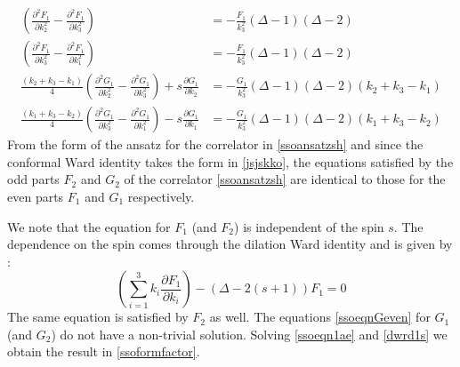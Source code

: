 \documentclass[a4paper,11pt]{article}
\begin{document}
\begin{align}\label{ssoeqn1ae}
\left(\frac{\partial^2 {F}_1}{\partial k_2^2}-\frac{\partial^2 {F}_1}{\partial k_3^2}\right)&= -\frac{{F}_1}{k_3^{2}}(\Delta-1)(\Delta-2)\nonumber\\
\left(\frac{\partial^2{F}_1}{\partial k_3^2}-\frac{\partial^2 {F}_1}{\partial k_1^2}\right)&= -\frac{{F}_1}{k_3^{2}}(\Delta-1)(\Delta-2)\\[5 pt]
\frac{(k_2+k_3-k_1)}{4}\left(\frac{\partial^2 {G}_1}{\partial k_2^2}-\frac{\partial^2 {G}_1}{\partial k_3^2}\right)+s\frac{\partial {G}_1}{\partial k_2} &=-\frac{{G}_1}{k_3^{2}}(\Delta-1)(\Delta-2)(k_2+k_3-k_1) \nonumber\\[5 pt]
\frac{(k_1+k_3-k_2)}{4}\left(\frac{\partial^2 {G}_1}{\partial k_3^2}-\frac{\partial^2 {G}_1}{\partial k_1^2}\right)-s\frac{\partial {G}_1}{\partial k_1} &= -\frac{{G}_1}{k_3^{2}}(\Delta-1)(\Delta-2)(k_1+k_3-k_2)\label{ssoeqnGeven}
\end{align}
From the form of the ansatz for the correlator in \eqref{ssoansatzsh} and since the conformal Ward identity takes the form in \eqref{jsjskko}, the equations satisfied by the odd parts $F_2$ and $G_2$ of the correlator \eqref{ssoansatzsh} are identical to those for the even parts $F_1$ and $G_1$ respectively.

We note that the equation for $F_1$ (and $F_2$) is independent of the spin $s$.
The dependence on the spin comes through the dilation Ward identity and is given by :
\begin{equation}\label{dwrd1s}
\left(\sum_{i=1}^3 k_i \frac{\partial {F}_{1}}{\partial k_i}\right)-(\Delta-2(s+1)){F}_{1}=0
\end{equation}
The same equation is satisfied by $F_2$ as well.
The equations \eqref{ssoeqnGeven} for $G_1$ (and $G_2$) do not have a non-trivial solution. Solving \eqref{ssoeqn1ae} and \eqref{dwrd1s} we obtain the result in \eqref{ssoformfactor}.
\end{document}
